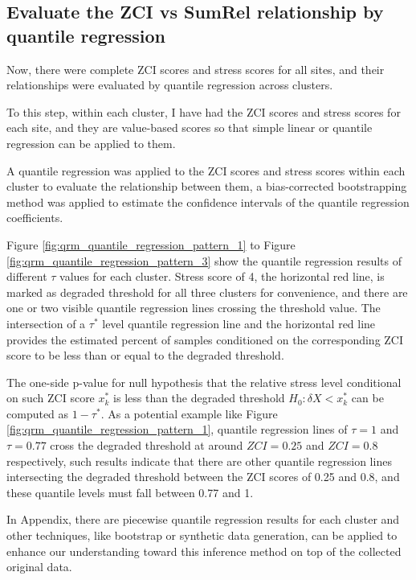 \subsection{Evaluate the ZCI vs SumRel relationship by quantile regression}

Now, there were complete ZCI scores and stress scores for all sites,
and their relationships were evaluated by quantile regression across clusters.

To this step, within each cluster, I have had the ZCI scores and stress scores for each site,
and they are value-based scores so that simple linear or quantile regression can be applied to them.

A quantile regression was applied to the ZCI scores and stress scores within each cluster 
to evaluate the relationship between them, a bias-corrected bootstrapping method was applied 
to estimate the confidence intervals of the quantile regression coefficients.

Figure \textcolor{blue}{\ref{fig:qrm_quantile_regression_pattern_1}} to Figure \textcolor{blue}{\ref{fig:qrm_quantile_regression_pattern_3}}
show the quantile regression results of different \(\tau\) values for each cluster.
Stress score of 4, the horizontal red line, is marked as degraded threshold for all three clusters for convenience,
and there are one or two visible quantile regression lines crossing the threshold value.
The intersection of a \(\tau^*\) level quantile regression line and the horizontal red line
provides the estimated percent of samples conditioned on the corresponding ZCI score
to be less than or equal to the degraded threshold.

The one-side p-value for null hypothesis that the relative stress level
conditional on such ZCI score \(x_k^*\) is less than the degraded threshold \(H_0: \delta X < x_k^*\)
can be computed as \(1 - \tau^*\). 
As a potential example like Figure \textcolor{blue}{\ref{fig:qrm_quantile_regression_pattern_1}},
quantile regression lines of \(\tau = 1\) and \(\tau = 0.77\) cross the degraded threshold
at around \(ZCI = 0.25\) and \(ZCI = 0.8\) respectively, such results indicate that
there are other quantile regression lines intersecting the degraded threshold between
the ZCI scores of 0.25 and 0.8, and these quantile levels must fall between 0.77 and 1.

In Appendix, there are piecewise quantile regression results for each cluster and 
other techniques, like bootstrap or synthetic data generation, can be applied to
enhance our understanding toward this inference method on top of the collected original data.

